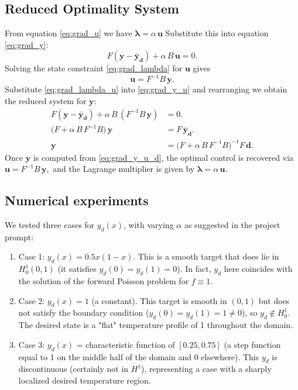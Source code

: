 \subsection*{Reduced Optimality System}
From equation \eqref{eq:grad_u} we have
\(\symbf{\lambda} = \alpha\,\mathbf{u}\)
Substitute this into equation \eqref{eq:grad_y}:
\[
	F(\mathbf{y}-\mathbf{\bar{y}_d}) + \alpha\,B\,\mathbf{u} = 0. \tag{4} \label{eq:grad_y_u}
\]
Solving the state constraint \eqref{eq:grad_lambda} for \(\mathbf{u}\) gives
\[
	\mathbf{u} = F^{-1}B\,\mathbf{y}. \tag{5} \label{eq:grad_lambda_u}
\]
Substitute \eqref{eq:grad_lambda_u} into \eqref{eq:grad_y_u} and rearranging we obtain the reduced system for \(\mathbf{y}\):
\begin{align*}
	F(\mathbf{y}-\mathbf{\bar{y}_d}) + \alpha\,B\,(F^{-1}B\,\mathbf{y}) & = 0.                                                                                  \\
	\bigl(F + \alpha\,B\,F^{-1}B\bigr)\,\mathbf{y}              & = F\,\mathbf{\bar{y}_d}.                                                                      \\
	\mathbf{y}                                                  & = \bigl(F + \alpha\,B\,F^{-1}B\bigr)^{-1}F\,\mathbf{d}. \tag{6} \label{eq:grad_y_u_d}
\end{align*}
Once \(\mathbf{y}\) is computed from \eqref{eq:grad_y_u_d}, the optimal control is recovered via \(\mathbf{u} = F^{-1}B\,\mathbf{y},\)
and the Lagrange multiplier is given by \(\symbf{\lambda} = \alpha\,\mathbf{u}\).


\subsection{Numerical experiments} 
We tested three cases for $y_d(x)$, with varying $\alpha$ as suggested in the project prompt:

\begin{enumerate}
	\item Case 1: $y_d(x) = 0.5x(1-x)$. This is a smooth target that does lie in $H^1_0(0,1)$ (it satisfies $y_d(0)=y_d(1)=0$). In fact, $y_d$ here coincides with the solution of the forward Poisson problem for $f\equiv 1$.
	\item Case 2: $y_d(x) = 1$ (a constant). This target is smooth in $(0,1)$ but does not satisfy the boundary condition ($y_d(0)=y_d(1)=1\neq0$), so $y_d\notin H^1_0$. The desired state is a "flat" temperature profile of 1 throughout the domain.
	\item Case 3: $y_d(x)$ = characteristic function of $[0.25,0.75]$ (a step function equal to 1 on the middle half of the domain and 0 elsewhere). This $y_d$ is discontinuous (certainly not in $H^1$), representing a case with a sharply localized desired temperature region.
\end{enumerate}

